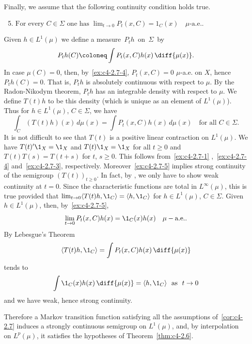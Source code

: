 \begin{example}
Finally, we assume that the following continuity condition holds true.
\begin{enumerate}[\upshape (i)]
\setcounter{enumi}{4}
\item \label{ex:c4-2.7-5}
$\text{For every } C \in \Sigma \text{ one has } \lim_{t \to 0} P_{t}(x,C) = 1_{C}(x) \quad \mu\text{-a.e.}.$
\end{enumerate}
Given $h \in L^{1}(\mu)$ we define a measure\, $P_{t}h$\, on\, $\Sigma$\, by
\[
P_{t}h(C) \coloneq \int P_{t}(x,C)h(x) \, \diff{\mu(x)} .
\]
In case $\mu(C) = 0$, then, by~\ref{ex:c4-2.7-4}, $P_{t}(x,C) = 0$ $\mu$-a.e. on $X$, hence $P_{t}h(C) = 0$.
That is, $P_{t}h$ is absolutely continuous with respect to $\mu$.
By the Radon-Nikodym theorem, $P_{t}h$ has an integrable density with respect to $\mu$.
We define $T(t)h$ to be this density (which is unique as an element of\/ $L^{1}(\mu)$).
Thus for $h \in L^{1}(\mu)$, $C \in \Sigma$, we have
\begin{equation}\label{eq:c4-2.8}
\int_{C}(T(t)h)(x) \, d\mu(x) = \int P_{t}(x,C)h(x) \, d\mu(x) \quad \text{for all } C \in \Sigma.
\end{equation}
It is not difficult to see that $T(t)$ is a positive linear contraction on $L^{1}(\mu)$.
We have $T(t)'\1_{X} = \1_{X}$ and $T(t)\1_{X} = \1_{X}$ for all $t \geq 0$ and $T(t)T(s) = T(t+s)$ for $t$, $s \geq 0$.
This follows from~\ref{ex:c4-2.7-1} ,~\ref{ex:c4-2.7-4} and~\ref{ex:c4-2.7-3}, respectively.
Moreover~\ref{ex:c4-2.7-5} implies strong continuity of the semigroup $(T(t))_{t \geq 0}$.
In fact, by \textcite[Proposition 1.23]{davies:1980}, we only have to show weak continuity at $t = 0$.
Since the characteristic functions are total in $L^{\infty}(\mu)$, this is true provided that $\lim_{t \to 0} \langle T(t)h,\1_{C}\rangle = \langle h,\1_{C}\rangle$ for $h \in L^{1}(\mu)$, $C \in \Sigma$.
Given $h \in L^{1}(\mu)$, then, by~\ref{ex:c4-2.7-5}, 
\[
\lim_{t \to 0} P_{t}(x,C)h(x) = \1_{C}(x)h(x)\quad\mu-\text{a.e.}.
\]
By Lebesgue's Theorem 
\[
\langle T(t)h,\1_{C}\rangle = \int P_{t}(x,C)h(x) \, \diff{\mu(x)}
\]
tends to 
\[
\int \1_{C}(x)h(x) \, \diff{\mu(x)} = \langle h,\1_{C}\rangle \ \text{ as } \ t \to 0
\]
and we have weak, hence strong continuity.

Therefore a Markov transition function satisfying all the assumptions of~\ref{cor:c4-2.7} induces a strongly continuous semigroup on $L^{1}(\mu)$, and, by interpolation on $L^{p}(\mu)$, it satisfies the hypotheses of Theorem~\ref{thm:c4-2.6}.
\end{example}
